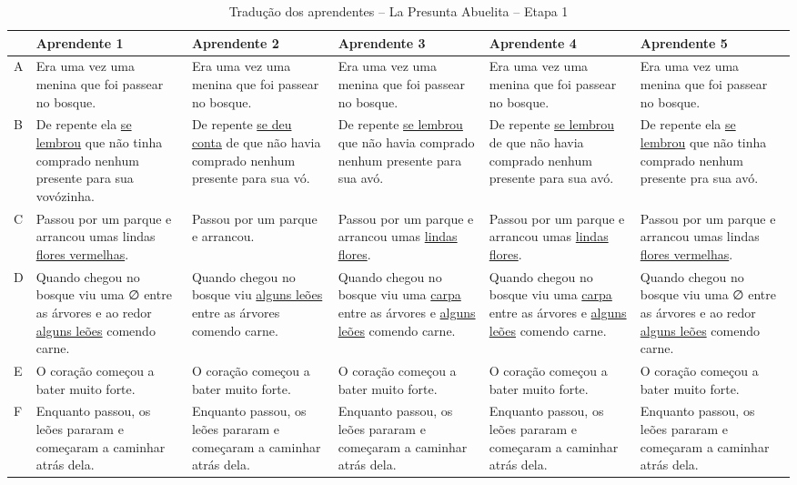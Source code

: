 \documentclass[portuguese]{textolivre}
\begin{document}
\begin{small}
\begin{longtable}{l *{5}{>{\raggedright\arraybackslash}p{2.4cm}}}
\caption{Tradução dos aprendentes – La Presunta Abuelita – Etapa 1\label{quadro2}} \\
\arrayrulecolor{black}
\toprule 
 & Aprendente 1 & Aprendente 2 & Aprendente 3 & 
 Aprendente 4 & Aprendente 5 \\
\midrule
\endfirsthead

\arrayrulecolor{lightgray}
A & Era uma vez uma menina que foi passear no bosque. & Era uma vez uma menina que foi passear no bosque. & Era uma vez uma menina que foi passear no bosque. & Era uma vez uma menina que foi passear no bosque. & Era uma vez uma menina que foi passear no bosque. \\
\hline
B & De repente ela \underline{se lembrou} que não tinha comprado ne\-nhum presente para sua vovózinha. & De repente \underline{se deu conta} de que não havia comprado ne\-nhum presente para sua vó. & De repente \underline{se lembrou} que não havia comprado ne\-nhum presente para sua avó. & De repente \underline{se lembrou} de que não havia comprado ne\-nhum presente para sua avó. & De repente ela \underline{se lembrou} que não tinha comprado ne\-nhum presente pra sua avó. \\
\hline
C & Passou por um parque e arrancou umas lindas \underline{flores vermelhas}. & Passou por um parque e arrancou. & Passou por um parque e arrancou umas \underline{lindas flores}. & Passou por um parque e arrancou umas \underline{lindas flores}. & Passou por um parque e arrancou umas lindas \underline{flores vermelhas}. \\
\hline
D & Quando chegou no bosque viu uma ∅ entre as árvores e ao redor \underline{alguns leões} comendo carne. & Quando chegou no bosque viu \underline{alguns leões} entre as árvores comendo carne. & Quando chegou no bosque viu uma \underline{carpa} entre as árvores e \underline{alguns leões} comendo carne. & Quando chegou no bosque viu uma \underline{carpa} entre as árvores e \underline{alguns leões} comendo carne. & Quando chegou no bosque viu uma ∅ entre as árvores e ao redor \underline{alguns leões} comendo carne. \\
\hline
E & O coração começou a bater muito forte. & O coração começou a bater muito forte. & O coração começou a bater muito forte. & O coração começou a bater muito forte. & O coração começou a bater muito forte. \\
\hline
F & Enquanto passou, os leões pararam e começaram a caminhar atrás dela. & Enquanto passou, os leões pararam e começaram a caminhar atrás dela. & Enquanto passou, os leões pararam e começaram a caminhar atrás dela. & Enquanto passou, os leões pararam e começaram a caminhar atrás dela. & Enquanto passou, os leões pararam e começaram a caminhar atrás dela. \\

\end{longtable}
\end{small}
\end{document}
